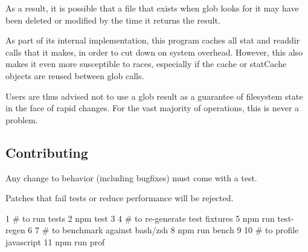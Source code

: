 As a result, it is possible that a file that exists when glob looks for it may have been deleted or modified by the time it returns the result.

As part of its internal implementation, this program caches all stat and readdir calls that it makes, in order to cut down on system overhead. However, this also makes it even more susceptible to races, especially if the cache or stat\+Cache objects are reused between glob calls.

Users are thus advised not to use a glob result as a guarantee of filesystem state in the face of rapid changes. For the vast majority of operations, this is never a problem.

\subsection*{Contributing}

Any change to behavior (including bugfixes) must come with a test.

Patches that fail tests or reduce performance will be rejected.


\begin{DoxyCode}
1 # to run tests
2 npm test
3 
4 # to re-generate test fixtures
5 npm run test-regen
6 
7 # to benchmark against bash/zsh
8 npm run bench
9 
10 # to profile javascript
11 npm run prof
\end{DoxyCode}
 